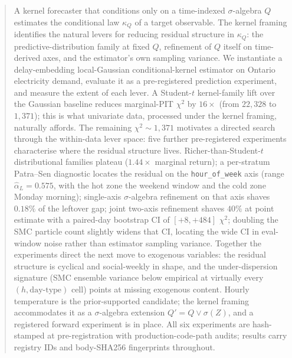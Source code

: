 \maketitle

\begin{abstract}
A kernel forecaster that conditions only on a time-indexed
$\sigma$-algebra $Q$ estimates the conditional law $\kappa_Q$ of
a target observable. The kernel framing identifies the natural
levers for reducing residual structure in $\kappa_Q$: the
predictive-distribution family at fixed $Q$, refinement of $Q$
itself on time-derived axes, and the estimator's own sampling
variance. We instantiate a delay-embedding local-Gaussian
conditional-kernel estimator on Ontario electricity demand,
evaluate it as a pre-registered prediction experiment, and
measure the extent of each lever. A Student-$t$ kernel-family
lift over the Gaussian baseline reduces marginal-PIT $\chi^2$ by
$16\times$ (from $22{,}328$ to $1{,}371$); this is what univariate
data, processed under the kernel framing, naturally affords. The
remaining $\chi^2 \sim 1{,}371$ motivates a directed search through
the within-data lever space: five further pre-registered
experiments characterise where the residual structure lives.
Richer-than-Student-$t$ distributional families plateau
($1.44\times$ marginal return); a per-stratum Patra--Sen
diagnostic locates the residual on the \texttt{hour\_of\_week}
axis (range $\hat\alpha_L = 0.575$, with the hot zone the weekend
window and the cold zone Monday morning); single-axis
$\sigma$-algebra refinement on that axis shaves $0.18\%$ of the
leftover gap; joint two-axis refinement shaves $40\%$ at point
estimate with a paired-day bootstrap CI of $[+8, +484]$ $\chi^2$;
doubling the SMC particle count slightly widens that CI,
locating the wide CI in eval-window noise rather than estimator
sampling variance. Together the experiments direct the next move
to exogenous variables: the residual structure is cyclical and
social-weekly in shape, and the under-dispersion signature
(SMC ensemble variance below empirical at virtually every
$(h, \text{day-type})$ cell) points at missing exogenous content.
Hourly temperature is the prior-supported candidate; the
kernel framing accommodates it as a $\sigma$-algebra extension
$Q' = Q \vee \sigma(Z)$, and a registered forward experiment is
in place. All six experiments are hash-stamped at pre-registration
with production-code-path audits; results carry registry IDs and
body-SHA256 fingerprints throughout.
\end{abstract}

